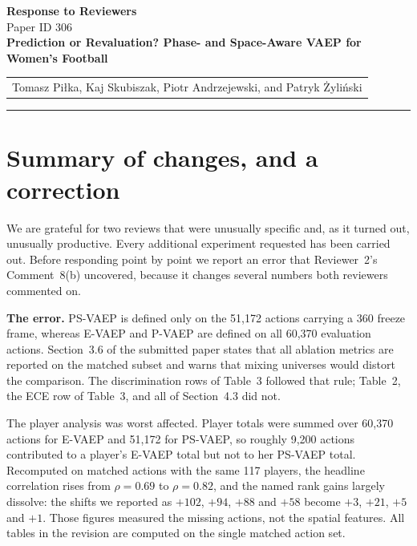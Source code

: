 \documentclass[11pt,a4paper]{article}
\begin{document}
\begin{center}
  {\LARGE\bfseries\color{navy} Response to Reviewers}\\[5pt]
  {\large Paper ID 306}\\[10pt]
  {\Large\bfseries Prediction or Revaluation? Phase- and Space-Aware VAEP for Women's Football}\\[8pt]
    \begin{tabular}{@{}l@{}}
  Tomasz Piłka, Kaj Skubiszak, Piotr Andrzejewski, and Patryk Żyliński
  \end{tabular} 
\end{center}

\vspace{4mm}
\hrule
\vspace{7mm}

\section{Summary of changes, and a correction}

We are grateful for two reviews that were unusually specific and, as it turned out, unusually productive. Every additional experiment requested has been carried out. Before responding point by point we report an error that Reviewer~2's Comment~8(b) uncovered, because it changes several numbers both reviewers commented on.

\textbf{The error.} PS-VAEP is defined only on the 51{,}172 actions carrying a 360 freeze frame, whereas E-VAEP and P-VAEP are defined on all 60{,}370 evaluation actions. Section~3.6 of the submitted paper states that all ablation metrics are reported on the matched subset and warns that mixing universes would distort the comparison. The discrimination rows of Table~3 followed that rule; Table~2, the ECE row of Table~3, and all of Section~4.3 did not.

The player analysis was worst affected. Player totals were summed over 60{,}370 actions for E-VAEP and 51{,}172 for PS-VAEP, so roughly 9{,}200 actions contributed to a player's E-VAEP total but not to her PS-VAEP total. Recomputed on matched actions with the same 117 players, the headline correlation rises from $\rho = 0.69$ to $\rho = 0.82$, and the named rank gains largely dissolve: the shifts we reported as $+102$, $+94$, $+88$ and $+58$ become $+3$, $+21$, $+5$ and $+1$. Those figures measured the missing actions, not the spatial features. All tables in the revision are computed on the single matched action set.
\end{document}
